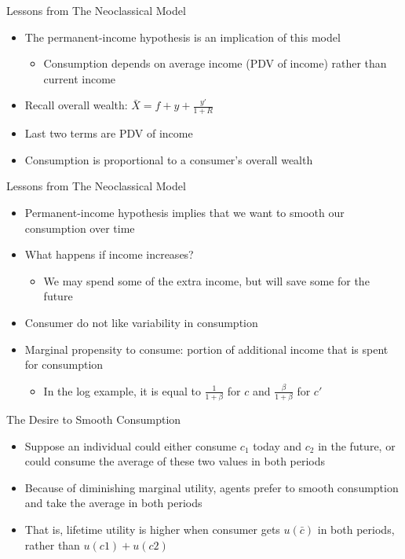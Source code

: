 \documentclass[aspectratio=1610]{beamer}
\begin{document}
\begin{frame}[wide]{Lessons from The Neoclassical Model}
	\begin{itemize}
		\item The permanent-income hypothesis is an implication of this model
		\begin{itemize}
			\item Consumption depends on average income (PDV of income) rather than current income 
		\end{itemize}
		\item Recall overall wealth: $\bar{X} = f + y + \frac{y'}{1+R}$
		\item[] Last two terms are PDV of income
		\item Consumption is proportional to a consumer’s overall wealth
	\end{itemize}
\end{frame}

\begin{frame}[wide]{Lessons from The Neoclassical Model}
	\begin{itemize}
		\item Permanent-income hypothesis implies that we want to smooth our consumption over time
		\item What happens if income increases?
		\begin{itemize}
			\item We may spend some of the extra income, but will save some for the future
		\end{itemize}
		\item Consumer do not like variability in consumption
		\item Marginal propensity to consume: portion of additional income that is spent for consumption
		\begin{itemize}
			\item In the log example, it is equal to $\frac{1}{1+\beta}$ for $c$ and $\frac{\beta}{1+\beta}$ for $c'$
		\end{itemize}
		
	\end{itemize}
\end{frame}

\begin{frame}[wide]{The Desire to Smooth Consumption}
	\begin{itemize}
		\item Suppose an individual could either consume $c_1$ today and $c_2$ in the future, or could consume the average of these two values in both periods
		\item Because of diminishing marginal utility, agents prefer to smooth consumption and take the average in both periods
		\item That is, lifetime utility is higher when consumer gets $u(\bar{c})$ in both periods, rather than $u(c1) + u(c2)$
	\end{itemize}
	\begin{figure}
		\centering
	\end{figure}
	
\end{frame}
\end{document}
